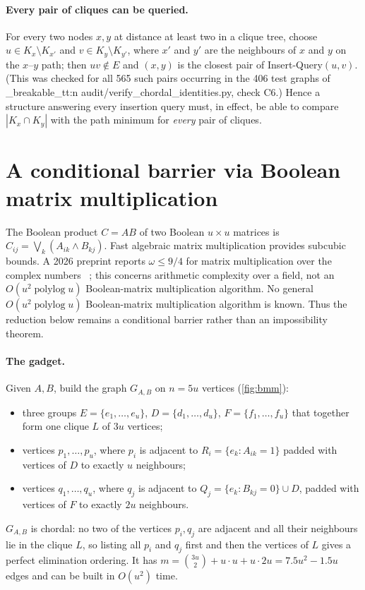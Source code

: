 \documentclass[11pt,a4paper,oneside]{report}
\theoremstyle{plain}
\theoremstyle{definition}
\theoremstyle{remark}
\newcommand{\op}[1]{\textsf{#1}}
\DeclareRobustCommand{\file}[1]{\mtp_breakable_tt:n {#1}}
\newcommand{\polylog}{\operatorname{polylog}}
\begin{document}
\paragraph{Every pair of cliques can be queried.} For every two nodes \(x,y\) at distance at
least two in a clique tree, choose \(u\in K_x\setminus K_{x'}\) and \(v\in K_y\setminus K_{y'}\),
where \(x'\) and \(y'\) are the neighbours of \(x\) and \(y\) on the \(x\)--\(y\) path; then
\(uv\notin E\) and \((x,y)\) is the closest pair of \op{Insert-Query}\((u,v)\). (This was checked
for all 565 such pairs occurring in the 406 test graphs of
\file{audit/verify_chordal_identities.py}, check C6.) Hence a
structure answering every insertion query must, in effect, be able to compare
\(|K_x\cap K_y|\) with the path minimum for \emph{every} pair of cliques.

\section{A conditional barrier via Boolean matrix multiplication}\label{sec:preproc-bmm}
The Boolean product \(C=AB\) of two Boolean \(u\times u\) matrices is
\(C_{ij}=\bigvee_k(A_{ik}\wedge B_{kj})\). Fast algebraic matrix multiplication provides subcubic bounds. A 2026 preprint
reports \(\omega\le 9/4\) for matrix multiplication over the complex numbers
~\cite{openai2026,shpilka2026}; this concerns arithmetic complexity over a field,
not an \(O(u^2\polylog u)\) Boolean-matrix multiplication algorithm.
No general \(O(u^2\polylog u)\) Boolean-matrix multiplication algorithm is
known. Thus the reduction below remains a conditional barrier rather than an
impossibility theorem.

\paragraph{The gadget.} Given \(A,B\), build the graph \(G_{A,B}\) on \(n=5u\) vertices
(\cref{fig:bmm}):
\begin{itemize}
\item three groups \(E=\{e_1,\dots,e_u\}\), \(D=\{d_1,\dots,d_u\}\), \(F=\{f_1,\dots,f_u\}\)
  that together form one clique \(L\) of \(3u\) vertices;
\item vertices \(p_1,\dots,p_u\), where \(p_i\) is adjacent to
  \(R_i=\{e_k: A_{ik}=1\}\) padded with vertices of \(D\) to exactly \(u\) neighbours;
\item vertices \(q_1,\dots,q_u\), where \(q_j\) is adjacent to
  \(Q_j=\{e_k: B_{kj}=0\}\cup D\), padded with vertices of \(F\) to exactly \(2u\) neighbours.
\end{itemize}
\(G_{A,B}\) is chordal: no two of the vertices \(p_i,q_j\) are adjacent and all their
neighbours lie in the clique \(L\), so listing all \(p_i\) and \(q_j\) first and then the
vertices of \(L\) gives a perfect elimination ordering. It has
\(m=\binom{3u}{2}+u\cdot u+u\cdot 2u=7.5u^2-1.5u\) edges and can be built in \(O(u^2)\) time.
\end{document}
